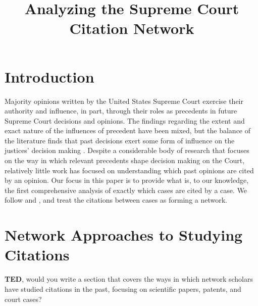 \documentclass[headsepline=true, abstracton]{scrartcl}
\begin{document}
\renewcommand{\refname}{Bibliography}


\onehalfspacing
\setlength{\headsep}{15mm}


\thispagestyle{plain}

\title{\Large Analyzing the Supreme Court Citation Network}
\maketitle

\begin{abstract}
\noindent 
\end{abstract}


 \section{Introduction}
 
Majority opinions written by the United States Supreme Court exercise their authority and influence, in part, through their roles as precedents in future Supreme Court decisions and opinions. The findings regarding the extent and exact nature of the influences of precedent have been mixed, but the balance of the literature finds that past decisions exert some form of influence on the justices' decision making \citep{knight1996norm,gillman2001s,richards2002jurisprudential,hansford2006politics,bailey2008does,bailey2011constrained}. Despite a considerable body of research that focuses on the way in which relevant precedents shape decision making on the Court, relatively little work has focused on understanding which past opinions are cited by an opinion. Our focus in this paper is to provide what is, to our knowledge, the first comprehensive analysis of exactly which cases are cited by a case. We follow \citet{fowler2007network} and \citet{fowler2008authority}, and treat the citations between cases as forming a network. 

\section{Network Approaches to Studying Citations}

\textbf{TED}, would you write a section that covers the ways in which network scholars have studied citations in the past, focusing on scientific papers, patents, and court cases? 

 
\end{document}
